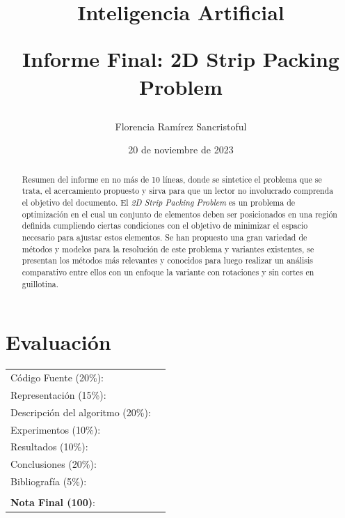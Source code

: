 \documentclass[letter, 10pt]{article}
\begin{document}
\title{Inteligencia Artificial \\ \begin{Large}Informe Final: 2D Strip Packing Problem\end{Large}}
\author{Florencia Ram\'irez Sancristoful}
\date{20 de noviembre de 2023}
\maketitle


\section*{Evaluaci\'on}

\begin{tabular}{ll}
C\'odigo Fuente (20\%): &  \underline{\hspace{2cm}}\\
Representaci\'on (15\%):  & \underline{\hspace{2cm}} \\
Descripci\'on del algoritmo (20\%):  & \underline{\hspace{2cm}} \\
Experimentos (10\%):  & \underline{\hspace{2cm}} \\
Resultados (10\%):  & \underline{\hspace{2cm}} \\
Conclusiones (20\%): &  \underline{\hspace{2cm}}\\
Bibliograf\'ia (5\%): & \underline{\hspace{2cm}}\\
 &  \\
\textbf{Nota Final (100)}:   & \underline{\hspace{2cm}}
\end{tabular}

\vspace{0.6cm}


\begin{abstract}
    Resumen del informe en no m\'as de 10 l\'ineas, donde se sintetice el problema que se trata, el acercamiento propuesto y sirva para que un lector no involucrado comprenda el objetivo del documento.
    \vspace{0.2cm}    
    El \emph{2D Strip Packing Problem} es un problema de optimizaci\'on en el cual un conjunto de elementos deben ser posicionados en una regi\'on definida cumpliendo ciertas condiciones con el objetivo de minimizar el espacio necesario para ajustar estos elementos. Se han propuesto una gran variedad de m\'etodos y modelos para la resoluci\'on de este problema y variantes existentes, se presentan los m\'etodos m\'as relevantes y conocidos para luego realizar un an\'alisis comparativo entre ellos con un enfoque la variante con rotaciones y sin cortes en guillotina.

\end{abstract}
\end{document}
